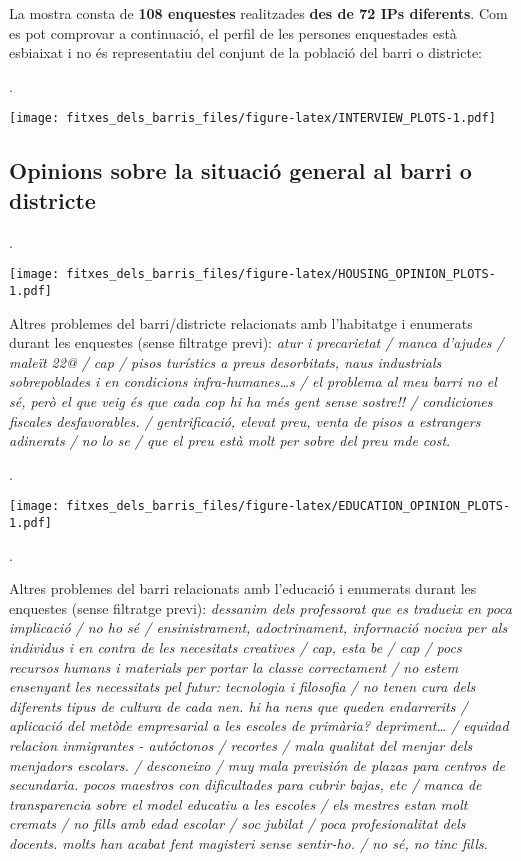 \documentclass[]{article}
\begin{document}
La mostra consta de \textbf{108 enquestes} realitzades \textbf{des de 72
IPs diferents}. Com es pot comprovar a continuació, el perfil de les
persones enquestades està esbiaixat i no és representatiu del conjunt de
la població del barri o districte:

.

\texttt{[image: fitxes\_dels\_barris\_files/figure-latex/INTERVIEW\_PLOTS-1.pdf]}

\newpage

\subsection{Opinions sobre la situació general al barri o
districte}\label{opinions-sobre-la-situacio-general-al-barri-o-districte}

.

\texttt{[image: fitxes\_dels\_barris\_files/figure-latex/HOUSING\_OPINION\_PLOTS-1.pdf]}

Altres problemes del barri/districte relacionats amb l'habitatge i
enumerats durant les enquestes (sense filtratge previ): \emph{atur i
precarietat / manca d'ajudes / maleït 22@ / cap / pisos turístics a
preus desorbitats, naus industrials sobrepoblades i en condicions
infra-humanes\ldots{}s / el problema al meu barri no el sé, però el que
veig és que cada cop hi ha més gent sense sostre!! / condiciones
fiscales desfavorables. / gentrificació, elevat preu, venta de pisos a
estrangers adinerats / no lo se / que el preu està molt per sobre del
preu mde cost}.

.

\texttt{[image: fitxes\_dels\_barris\_files/figure-latex/EDUCATION\_OPINION\_PLOTS-1.pdf]}

.

Altres problemes del barri relacionats amb l'educació i enumerats durant
les enquestes (sense filtratge previ): \emph{dessanim dels professorat
que es tradueix en poca implicació / no ho sé / ensinistrament,
adoctrinament, informació nociva per als individus i en contra de les
necesitats creatives / cap, esta be / cap / pocs recursos humans i
materials per portar la classe correctament / no estem ensenyant les
necessitats pel futur: tecnologia i filosofia / no tenen cura dels
diferents tipus de cultura de cada nen. hi ha nens que queden
endarrerits / aplicació del metòde empresarial a les escoles de
primària? depriment\ldots{} / equidad relacion inmigrantes - autóctonos
/ recortes / mala qualitat del menjar dels menjadors escolars. /
desconeixo / muy mala previsión de plazas para centros de secundaria.
pocos maestros con dificultades para cubrir bajas, etc / manca de
transparencia sobre el model educatiu a les escoles / els mestres estan
molt cremats / no fills amb edad escolar / soc jubilat / poca
profesionalitat dels docents. molts han acabat fent magisteri sense
sentir-ho. / no sé, no tinc fills}.
\end{document}
